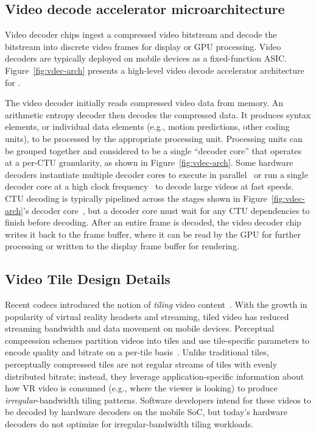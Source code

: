 \subsection{Video decode accelerator microarchitecture}
\label{subsec:vd-arch}
Video decoder chips ingest a compressed video bitstream and decode the bitstream into discrete video frames for display or GPU processing.
Video decoders are typically deployed on mobile devices as a fixed-function ASIC.
Figure~\ref{fig:vdec-arch} presents a high-level video decode accelerator architecture for \hevc.

The video decoder initially reads compressed video data from memory.
An arithmetic entropy decoder then decodes the compressed data.
It produces syntax elements, or individual data elements (e.g., motion predictions, other coding units), to be processed by the appropriate processing unit.
Processing units can be grouped together and considered to be a single ``decoder core'' that operates at a per-CTU granularity, as shown in Figure~\ref{fig:vdec-arch}.
Some hardware decoders instantiate multiple decoder cores to execute in parallel~\cite{tikekar18ijssc} or run a single decoder core at a high clock frequency~\cite{8khevc-ijssc} to decode large videos at fast speeds.
CTU decoding is typically pipelined across the stages shown in Figure~\ref{fig:vdec-arch}'s decoder core~\cite{8khevc-ijssc}, but a decoder core must wait for any CTU dependencies to finish before decoding.
After an entire frame is decoded, the video decoder chip writes it back to the frame buffer, where it can be read by the GPU for further processing or written to the display frame buffer for rendering.

\subsection{Video Tile Design Details}
\label{subsec:tiles}

Recent codecs introduced the notion of \emph{tiling} video content~\cite{misra2013tiles}.
With the growth in popularity of virtual reality headsets and \threesixty streaming, tiled video has reduced streaming bandwidth and data movement on mobile devices.
Perceptual compression schemes partition videos into tiles and use tile-specific parameters to encode quality and bitrate on a per-tile basis~\cite{visualcloud2017haynes}.
Unlike traditional \hevc tiles, perceptually compressed tiles are not regular streams of tiles with evenly distributed bitrate; instead, they leverage application-specific information about how VR video is consumed (e.g., where the viewer is looking) to produce \emph{irregular}-bandwidth tiling patterns.
Software developers intend for these videos to be decoded by hardware decoders on the mobile SoC, but today's hardware decoders do not optimize for irregular-bandwidth tiling workloads.

